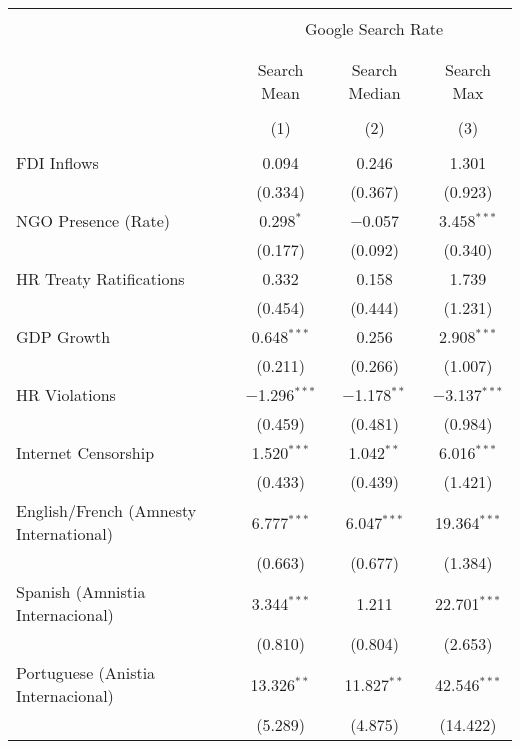 
\begin{table}[!htbp] \centering 
  \caption{} 
  \label{} 
\begin{tabular}{@{\extracolsep{5pt}}lccc} 
\\[-1.8ex]\hline 
\hline \\[-1.8ex] 
 & \multicolumn{3}{c}{Google Search Rate} \\ 
\cline{2-4} 
\\[-1.8ex] & \multicolumn{3}{c}{ } \\ 
 & Search Mean & Search Median & Search Max \\ 
\\[-1.8ex] & (1) & (2) & (3)\\ 
\hline \\[-1.8ex] 
 FDI Inflows & 0.094 & 0.246 & 1.301 \\ 
  & (0.334) & (0.367) & (0.923) \\ 
  NGO Presence (Rate) & 0.298$^{*}$ & $-$0.057 & 3.458$^{***}$ \\ 
  & (0.177) & (0.092) & (0.340) \\ 
  HR Treaty Ratifications & 0.332 & 0.158 & 1.739 \\ 
  & (0.454) & (0.444) & (1.231) \\ 
  GDP Growth & 0.648$^{***}$ & 0.256 & 2.908$^{***}$ \\ 
  & (0.211) & (0.266) & (1.007) \\ 
  HR Violations & $-$1.296$^{***}$ & $-$1.178$^{**}$ & $-$3.137$^{***}$ \\ 
  & (0.459) & (0.481) & (0.984) \\ 
  Internet Censorship & 1.520$^{***}$ & 1.042$^{**}$ & 6.016$^{***}$ \\ 
  & (0.433) & (0.439) & (1.421) \\ 
  English/French (Amnesty International) & 6.777$^{***}$ & 6.047$^{***}$ & 19.364$^{***}$ \\ 
  & (0.663) & (0.677) & (1.384) \\ 
  Spanish (Amnistia Internacional) & 3.344$^{***}$ & 1.211 & 22.701$^{***}$ \\ 
  & (0.810) & (0.804) & (2.653) \\ 
  Portuguese (Anistia Internacional) & 13.326$^{**}$ & 11.827$^{**}$ & 42.546$^{***}$ \\ 
  & (5.289) & (4.875) & (14.422) \\ 

\end{tabular}
\end{table}
